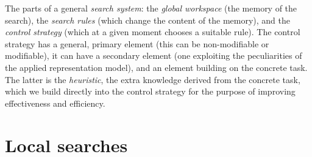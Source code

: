 \documentclass[margin=0px]{article}
\begin{document}
The parts of a general \textit{search system}: the \textit{global workspace} (the memory of the search), the \textit{search rules} (which change the content of the memory), and the \textit{control strategy} (which at a given moment chooses a suitable rule). The control strategy has a general, primary element (this can be non-modifiable or modifiable), it can have a secondary element (one exploiting the peculiarities of the applied representation model), and an element building on the concrete task. The latter is the \textit{heuristic}, the extra knowledge derived from the concrete task, which we build directly into the control strategy for the purpose of improving effectiveness and efficiency.

\section{Local searches}
\end{document}
